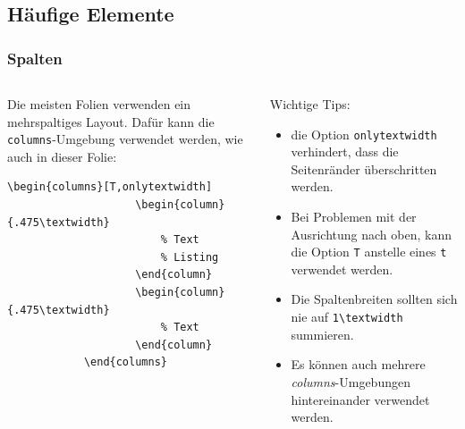 \documentclass[german,notoc]{tudbeamer}%
\begin{document}
\subsection{Häufige Elemente}
\begin{frame}[fragile]
	\frametitle{Spalten}

	\begin{columns}[T,onlytextwidth]
		\begin{column}{.475\textwidth}
			Die meisten Folien verwenden ein mehrspaltiges Layout. Dafür kann die \texttt{columns}-Umgebung verwendet werden, wie auch in dieser Folie:
			\begin{lstlisting}[gobble=8,style=latex,numbers=none]
				\begin{columns}[T,onlytextwidth]
					\begin{column}{.475\textwidth}
						% Text
						% Listing
					\end{column}
					\begin{column}{.475\textwidth}
						% Text
					\end{column}
			\end{columns}
			\end{lstlisting} 
		\end{column}
		\begin{column}{.475\textwidth}
			Wichtige Tips:
			\begin{itemize}
				\item die Option \texttt{onlytextwidth} verhindert, dass die Seitenränder überschritten werden.
				\item Bei Problemen mit der Ausrichtung nach oben, kann die Option \texttt{T} anstelle eines \texttt{t} verwendet werden.
				\item Die Spaltenbreiten sollten sich nie auf \texttt{1\textbackslash textwidth} summieren.
				\item Es können auch mehrere \emph{columns}-Umgebungen hintereinander verwendet werden.
			\end{itemize}
		\end{column}
	\end{columns}
\end{frame}
\end{document}
